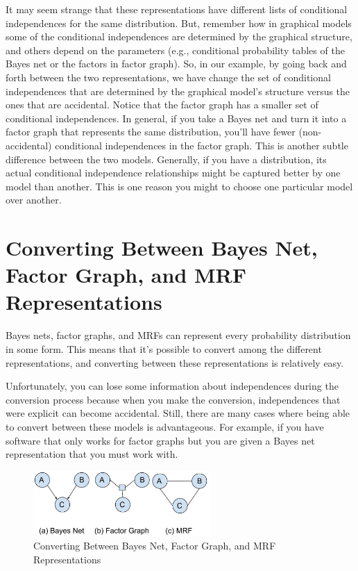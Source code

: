 \documentclass[twoside]{article}
\begin{document}
It may seem strange that these representations have different lists of conditional independences for the same
distribution.
But, remember how in graphical models some of the conditional independences are determined
by the graphical structure, and others depend on the parameters (e.g., conditional probability tables of the Bayes net
or the factors in factor graph).
So, in our example, by going back and forth between the two representations, we have change the set of 
conditional independences that are determined by the graphical model's structure versus the ones that are accidental.
Notice that the factor graph has a smaller set of conditional independences.
In general, if you take a Bayes net and turn it into a factor graph that represents the same distribution,
you'll have fewer (non-accidental) conditional independences in the factor graph.
This is another subtle difference between the two models.
Generally, if you have a distribution, its actual conditional 
independence relationships might be captured better by one model than another.
This is one reason you might to choose one particular model over another.

\section{Converting Between Bayes Net, Factor Graph, and MRF Representations}
Bayes nets, factor graphs, and MRFs can represent every probability distribution in some form.
This means that it's possible to convert among the different representations, and converting between these representations is relatively easy.

Unfortunately, you can lose some information about independences during the conversion process because
when you make the conversion, independences that were explicit can become accidental.
Still, there are many cases where being able to convert between these models is advantageous.
For example,  if you have software that only works for factor graphs but you are given a Bayes net representation that you must work with.

\begin{figure}[h]
\caption{Converting Between Bayes Net, Factor Graph, and MRF Representations}
\label{fig:f4}
\centering
\includegraphics[width=0.6\textwidth]{conv}
\end{figure}
\end{document}
